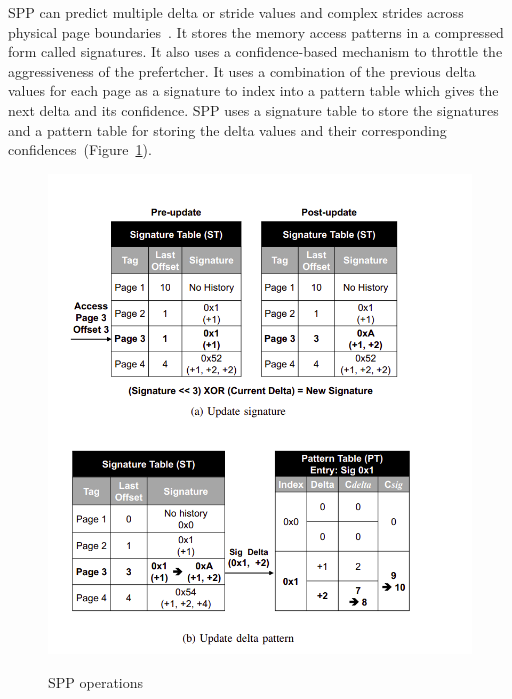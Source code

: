 SPP can predict multiple delta or stride values and complex strides across physical page boundaries~\cite{SPP}. It stores the memory access patterns in a compressed form called signatures. It also uses a confidence-based mechanism to throttle the aggressiveness of the prefertcher.
It uses a combination of the previous delta values for each page as a signature to index into a pattern table which gives the next delta and its confidence.
SPP uses a signature table to store the signatures and a pattern table for storing the delta values and their corresponding confidences~(Figure~\ref{fig:spp}). \begin{figure}[H]
{\includegraphics[scale=0.6]{images/SPP1.png}}
\caption{SPP operations~\cite{SPP}}
\label{fig:spp}
\end{figure}

